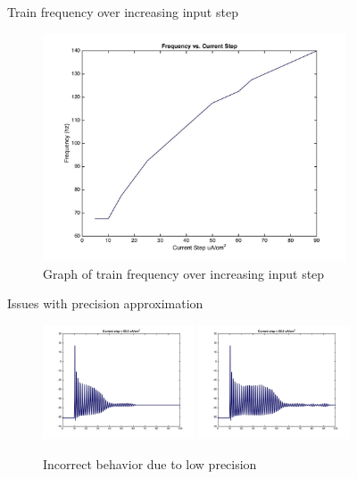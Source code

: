 \documentclass{beamer}
\begin{document}
\begin{frame}{Train frequency over increasing input step}
\begin{figure}
    \centering
    \includegraphics[width = 0.8\textwidth]{./images/freqvscurrent.jpg}
    \caption{Graph of train frequency over increasing input step}
  \end{figure}

\end{frame}


\begin{frame}{Issues with precision approximation}
  \begin{figure}
    \centering
    \includegraphics[width = 0.4\textwidth]{./images/current55p5.jpg}
    \includegraphics[width = 0.4\textwidth]{./images/current55p6.jpg}
    \caption{Incorrect behavior due to low precision}
  \end{figure}
\end{frame}
\end{document}
